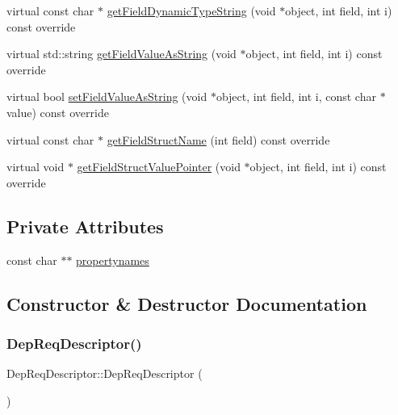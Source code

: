 \begin{DoxyCompactItemize}
\item 
virtual const char $\ast$ \hyperlink{classDepReqDescriptor_a734079401bce70ebe9dd48ebf997c8f1}{get\+Field\+Dynamic\+Type\+String} (void $\ast$object, int field, int i) const override
\item 
virtual std\+::string \hyperlink{classDepReqDescriptor_a40708b1630241458821cbfce1e4dd79e}{get\+Field\+Value\+As\+String} (void $\ast$object, int field, int i) const override
\item 
virtual bool \hyperlink{classDepReqDescriptor_af11c27d9903fc2d076855c9e1feda41b}{set\+Field\+Value\+As\+String} (void $\ast$object, int field, int i, const char $\ast$value) const override
\item 
virtual const char $\ast$ \hyperlink{classDepReqDescriptor_acba71c972a19a687da42bb2c07baca42}{get\+Field\+Struct\+Name} (int field) const override
\item 
virtual void $\ast$ \hyperlink{classDepReqDescriptor_a9022933bea91f71f62d6dc8befb94310}{get\+Field\+Struct\+Value\+Pointer} (void $\ast$object, int field, int i) const override
\end{DoxyCompactItemize}
\subsection*{Private Attributes}
\begin{DoxyCompactItemize}
\item 
const char $\ast$$\ast$ \hyperlink{classDepReqDescriptor_a0d724047f7da4672219cb81300cfbdd4}{propertynames}
\end{DoxyCompactItemize}


\subsection{Constructor \& Destructor Documentation}
\mbox{\label{classDepReqDescriptor_acc9a0e0eef48f3a21fc8ac17d63bf10a}} 
\subsubsection{\texorpdfstring{Dep\+Req\+Descriptor()}{DepReqDescriptor()}}
{\footnotesize\ttfamily Dep\+Req\+Descriptor\+::\+Dep\+Req\+Descriptor (\begin{DoxyParamCaption}{ }\end{DoxyParamCaption})}

